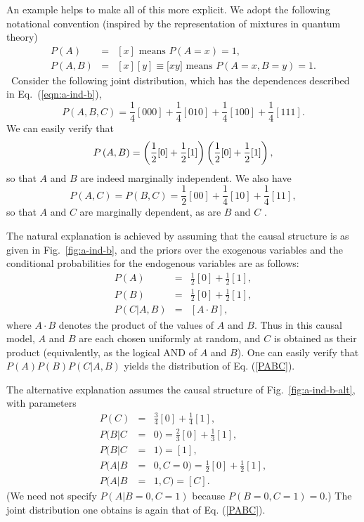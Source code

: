 \documentclass[12pt,onecolumn,nofootinbib]{revtex4-2}
\begin{document}
An example helps to make all of this more explicit.  
We adopt the following notational convention (inspired by the representation
of mixtures in quantum theory)
\begin{eqnarray*}
P(A) &=&[x] \text{ means }P\left( A=x\right) =1, \\
P(A,B) &=&[x][y]\equiv \lbrack xy]\text{ means } P\left( A=x,B=y\right) =1.
\end{eqnarray*}%
\ Consider the following joint distribution, which has the dependences
described in Eq.~(\ref{eqn:a-ind-b}),
\begin{equation}
P(A,B,C)=\frac{1}{4}[000]+\frac{1}{4}[010]+\frac{1}{4}[100]+\frac{1}{4}[111].
\label{PABC}
\end{equation}
We can easily verify that
\begin{equation*}
P\left( A,B\right) =\left( \frac{1}{2}[0]+\frac{1}{2}[1]\right) \left( \frac{%
1}{2}[0]+\frac{1}{2}[1]\right) ,
\end{equation*}%
so that $A$ and $B$ are indeed marginally independent.  We also have
\begin{equation*}
P(A,C)=P(B,C)=\frac{1}{2}[00]+\frac{1}{4}[10]+\frac{1}{4}[11],
\end{equation*}%
so that $A$ and $C$ are marginally dependent, as are $B$ and $C$ .

The natural explanation is achieved by assuming that the causal structure is as given in Fig.~\ref{fig:a-ind-b}, and the priors over the exogenous variables and the conditional
probabilities for the endogenous variables are as follows:%
\begin{eqnarray*}
P(A) &=&\frac{1}{2}[0]+\frac{1}{2}[1], \\
P(B) &=&\frac{1}{2}[0]+\frac{1}{2}[1], \\
P(C|A,B) &=&\left[ A\cdot B\right] ,
\end{eqnarray*}%
where $A\cdot B$ denotes the product of the values of $A$ and $B.$ Thus in this
causal model, $A$ and $B$ are each chosen uniformly at random, and $C$ is
obtained as their product (equivalently, as the logical AND of $A$ and $B$).
 One can easily verify that $P(A)P(B)P(C|A,B)$ yields the distribution of
Eq. (\ref{PABC}).

The alternative explanation assumes the causal structure of Fig.~\ref{fig:a-ind-b-alt}, with
parameters
\begin{eqnarray*}
P(C) &=&\frac{3}{4}[0]+\frac{1}{4}[1], \\
P(B|C &=&0)=\frac{2}{3}[0]+\frac{1}{3}[1], \\
P(B|C &=&1)=[1], \\
P(A|B &=&0,C=0)=\frac{1}{2}[0]+\frac{1}{2}[1], \\
P(A|B &=&1,C)=[C].
\end{eqnarray*}%
(We need not specify $P(A| B=0, C=1)$ because $P(B=0, C=1)=0$.)  The joint distribution one obtains is again that of Eq. (\ref{PABC}).
\end{document}
